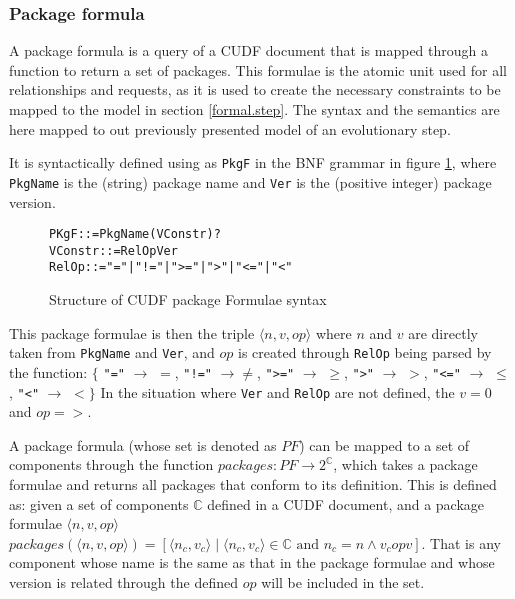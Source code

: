 \subsubsection{Package formula}
A package formula is a query of a CUDF document that is mapped through a function to return a set of packages.
This formulae is the atomic unit used for all relationships and requests, as it is used to create the necessary constraints to be mapped to the model in section \ref{formal.step}. 
The syntax and the semantics are here mapped to out previously presented model of an evolutionary step. 

It is syntactically defined using as \verb+PkgF+ in the BNF grammar in figure \ref{formal.cudfpackageformulasyntax},
where \verb+PkgName+ is the (string) package name and \verb+Ver+ is the (positive integer) package version. 

\begin{figure}[htp] 
\begin{center}
\begin{alltt}
PKgF ::= PkgName (VConstr)?
VConstr ::= RelOp Ver
RelOp ::=  "=" | "!=" | ">=" | ">" | "<=" | "<"
\end{alltt}
  \caption[Package Formulae syntax]{Structure of CUDF package Formulae syntax}
  \label{formal.cudfpackageformulasyntax}
\end{center}
\end{figure}

This package formulae is then the triple $\langle n,v,op\rangle$ where $n$ and $v$ are directly taken from \verb+PkgName+ and \verb+Ver+,
and $op$ is created through \verb+RelOp+ being parsed by the function:  
$\{$ \verb+"="+ $\rightarrow$ $=$, \verb+"!="+ $\rightarrow \not =$, \verb+">="+ $\rightarrow$ $\geq$, \verb+">"+ $\rightarrow$ $>$, \verb+"<="+ $\rightarrow$ $\leq$, \verb+"<"+ $\rightarrow$ $<$$\}$
In the situation where \verb+Ver+ and \verb+RelOp+ are not defined, the $v = 0$ and $op = >$.

A package formula (whose set is denoted as $PF$) can be mapped to a set of components through the function $packages: PF \rightarrow 2^{\mathbb{C}}$,
which takes a package formulae and returns all packages that conform to its definition.
This is defined as:
given a set of components $\mathbb{C}$ defined in a CUDF document, and a package formulae $\langle n,v,op\rangle$
$packages(\langle n,v,op\rangle) = [\langle n_c,v_c \rangle \mid \langle n_c,v_c \rangle \in \mathbb{C} \mbox{ and } n_c = n \wedge v_c op v]$.
That is any component whose name is the same as that in the package formulae and whose version is related through the defined $op$ will be included in the set.

